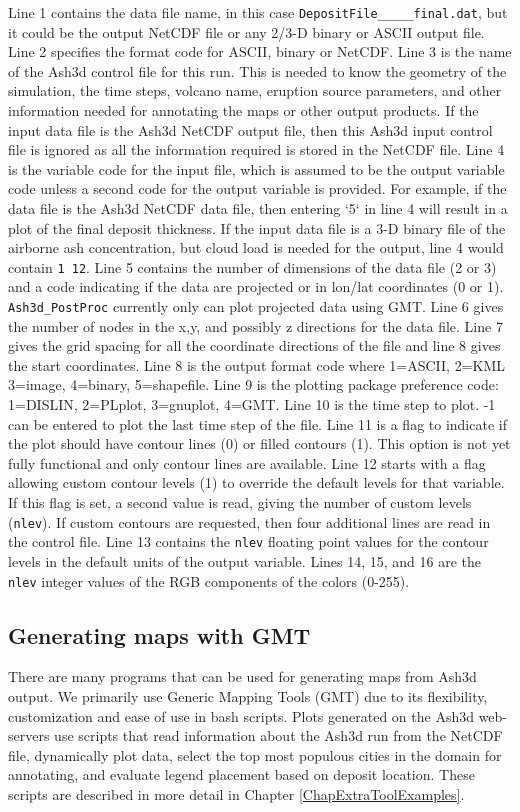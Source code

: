 Line 1 contains the data file name, in this case
\texttt{DepositFile\_\_\_\_\_final.dat}, but it could be
the output NetCDF file or any 2/3-D binary or ASCII output file.
Line 2 specifies the format code for ASCII, binary or NetCDF.
Line 3 is the name of the Ash3d control file for this run. This is needed to know the geometry
of the simulation, the time steps, volcano name, eruption source parameters, and
other information needed for annotating the maps or other output products. If the
input data file is the Ash3d NetCDF output file, then this Ash3d input control file
is ignored as all the information required is stored in the NetCDF file.
Line 4 is the variable code for the input file, which is assumed to be the output
variable code unless a second code for the output variable is provided. For example, if
the data file is the Ash3d NetCDF data file, then entering `5` in line 4 will result
in a plot of the final deposit thickness. If the input data file is a 3-D binary
file of the airborne ash concentration, but cloud load is needed for the output, line
4 would contain \texttt{1 12}.
Line 5 contains the number of dimensions of the data file (2 or 3) and a code indicating if
the data are projected or in lon/lat coordinates (0 or 1). \texttt{Ash3d\_PostProc} currently
only can plot projected data using GMT.
Line 6 gives the number of nodes in the x,y, and possibly z directions for the data file.
Line 7 gives the grid spacing for all the coordinate directions of the file and line 8
gives the start coordinates.
Line 8 is the output format code where 1=ASCII, 2=KML 3=image, 4=binary, 5=shapefile.
Line 9 is the plotting package preference code: 1=DISLIN, 2=PLplot, 3=gnuplot, 4=GMT.
Line 10 is the time step to plot. -1 can be entered to plot the last time step of the
file.
Line 11 is a flag to indicate if the plot should have contour lines (0) or filled contours (1).
This option is not yet fully functional and only contour lines are available.
Line 12 starts with a flag allowing custom contour levels (1) to override the default
levels for that variable. If this flag is set, a second value is read, giving the
number of custom levels (\texttt{nlev}).
If custom contours are requested, then four additional lines are read in the control file.
Line 13 contains the \texttt{nlev} floating point values for the contour levels in the
default units of the output variable.
Lines 14, 15, and 16 are the \texttt{nlev} integer values of the RGB components of the colors (0-255).

\subsection{Generating maps with GMT}\label{ChapUsageSecPostProcGMT}
There are many programs that can be used for generating maps from Ash3d output. We primarily
use Generic Mapping Tools (GMT) due to its flexibility, customization and ease of use in
bash scripts. Plots generated on the Ash3d web-servers use scripts that read information
about the Ash3d run from the NetCDF file, dynamically plot data, select the top most populous
cities in the domain for annotating, and evaluate legend placement based on deposit location.
These scripts are described in more detail in Chapter \ref{ChapExtraToolExamples}.

